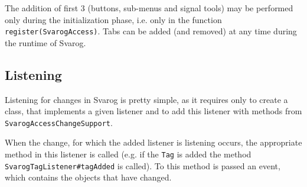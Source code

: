 \documentclass{article}
\begin{document}
The addition of first 3 (buttons, sub-menus and signal tools) may be performed only during the initialization phase,
i.e. only in the function \verb=register(SvarogAccess)=.
Tabs can be added (and removed) at any time during the runtime of Svarog.



\subsection{Listening}
\label{listeners}
Listening for changes in Svarog is pretty simple, as it requires only to create a class, that implements a given listener
and to add this listener with methods from \verb=SvarogAccessChangeSupport=.

When the change, for which the added listener is listening occurs, the appropriate method in this listener is called
(e.g. if the \verb=Tag= is added the method \verb=SvarogTagListener#tagAdded= is called).
To this method is passed an event, which contains the objects that have changed.
\end{document}
